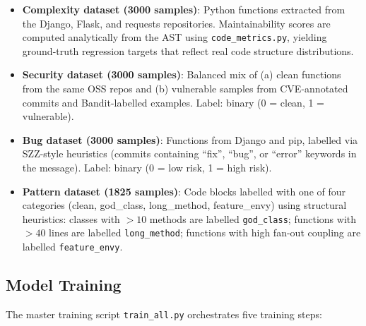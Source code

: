 \documentclass[12pt, oneside]{report}
\begin{document}
\begin{itemize}
  \item \textbf{Complexity dataset (3000 samples)}: Python functions extracted from the
    Django, Flask, and requests repositories. Maintainability scores are computed
    analytically from the AST using \texttt{code\_metrics.py}, yielding ground-truth
    regression targets that reflect real code structure distributions.
  \item \textbf{Security dataset (3000 samples)}: Balanced mix of (a) clean functions
    from the same OSS repos and (b) vulnerable samples from CVE-annotated commits and
    Bandit-labelled examples. Label: binary (0 = clean, 1 = vulnerable).
  \item \textbf{Bug dataset (3000 samples)}: Functions from Django and pip, labelled via
    SZZ-style heuristics (commits containing ``fix'', ``bug'', or ``error'' keywords in the
    message). Label: binary (0 = low risk, 1 = high risk).
  \item \textbf{Pattern dataset (1825 samples)}: Code blocks labelled with one of four
    categories (clean, god\_class, long\_method, feature\_envy) using structural
    heuristics: classes with $> 10$ methods are labelled \texttt{god\_class}; functions
    with $> 40$ lines are labelled \texttt{long\_method}; functions with high fan-out
    coupling are labelled \texttt{feature\_envy}.
\end{itemize}

\subsection{Model Training}

The master training script \texttt{train\_all.py} orchestrates five training steps:
\end{document}
